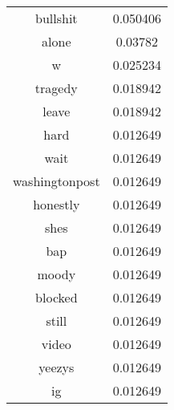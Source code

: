 \documentclass[12pt]{amsart}
\newcommand{\0}{\mat{0}}
\newcommand{\1}{\mathds{1}}
\begin{document}
\begin{table}[!h]
\begin{minipage}{.5\linewidth}
{\begin{tabular}{|c|c|}
                bullshit & 0.050406 \\
                alone & 0.03782 \\
                w & 0.025234 \\
                tragedy & 0.018942 \\
                leave & 0.018942 \\
                hard & 0.012649 \\
                wait & 0.012649 \\
                washingtonpost & 0.012649 \\
                honestly & 0.012649 \\
                shes & 0.012649 \\
                bap & 0.012649 \\
                moody & 0.012649 \\
                blocked & 0.012649 \\
                still & 0.012649 \\
                video & 0.012649 \\
                yeezys & 0.012649 \\
                ig & 0.012649 \\
                \hline
        	\end{tabular}
        }
    \end{minipage} 
\end{table}

\clearpage\clearpage
\end{document}

